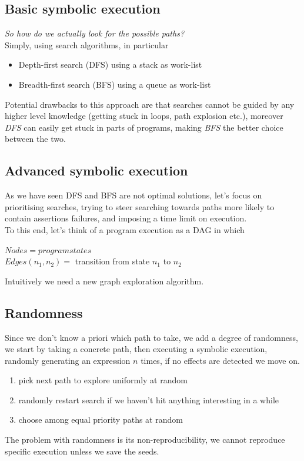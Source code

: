 \documentclass[11pt, oneside]{article}   	%
\begin{document}
\subsection*{Basic symbolic execution}
\emph{So how do we actually look for the possible paths?}\\
Simply, using search algorithms, in particular
\begin{itemize}
\item Depth-first search (DFS) using a stack as work-list
\item Breadth-first search (BFS) using a queue as work-list
\end{itemize}
Potential drawbacks to this approach are that searches cannot be guided by any higher level knowledge (getting stuck in loops, path explosion etc.), moreover \emph{DFS} can easily get stuck in parts of programs, making \emph{BFS} the better choice between the two.

\subsection*{Advanced symbolic execution}
As we have seen DFS and BFS are not optimal solutions, let's focus on prioritising searches, trying to steer searching towards paths more likely to contain assertions failures, and imposing a time limit on execution.\\
To this end, let's think of a program execution as a DAG in which

\begin{center}
$Nodes = program states$\\
$Edges(n_1, n_2) =$ transition from state $n_1$ to $n_2$
\end{center}
Intuitively we need a new graph exploration algorithm.

\subsection*{Randomness}
Since we don't know a priori which path to take, we add a degree of randomness,  we start by taking a concrete path, then executing a symbolic execution, randomly generating an expression $n$ times, if no effects are detected we move on.
\begin{enumerate}
\item pick next path to explore uniformly at random
\item randomly restart search if we haven't hit anything interesting in a while
\item choose among equal priority paths at random
\end{enumerate}
The problem with randomness is its non-reproducibility, we cannot reproduce specific execution unless we save the seeds.
\end{document}
